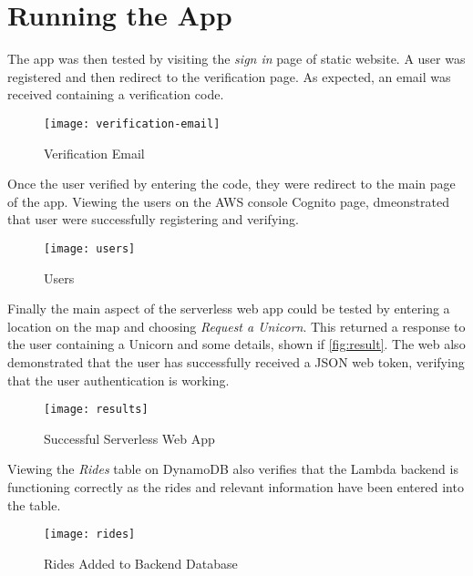 \section{Running the App}
The app was then tested by visiting the \textit{sign in} page of static website. A user was registered and then redirect to the verification page. As expected, an email was received containing a verification code.


\begin{figure}[H]
  \caption{Verification Email}
  \centering
  \texttt{[image: verification-email]}
  \label{fig:email}
\end{figure}

\noindent Once the user verified by entering the code, they were redirect to the main page of the app. Viewing the users on the AWS console Cognito page, dmeonstrated that user were successfully registering and verifying.

\begin{figure}[H]
  \caption{Users}
  \centering
  \texttt{[image: users]}
  \label{fig:users}
\end{figure}

\noindent Finally the main aspect of the serverless web app could be tested by entering a location on the map and choosing \textit{Request a Unicorn}. This returned a response to the user containing a Unicorn and some details, shown if \autoref{fig:result}. The web also demonstrated that the user has successfully received a JSON web token, verifying that the user authentication is working. 

\begin{figure}[H]
  \caption{Successful Serverless Web App}
  \centering
  \texttt{[image: results]}
  \label{fig:results}
\end{figure}

\noindent Viewing the \textit{Rides} table on DynamoDB also verifies that the Lambda backend is functioning correctly as the rides and relevant information have been entered into the table.

\begin{figure}[H]
  \caption{Rides Added to Backend Database}
  \centering
  \texttt{[image: rides]}
  \label{fig:rides}
\end{figure}
